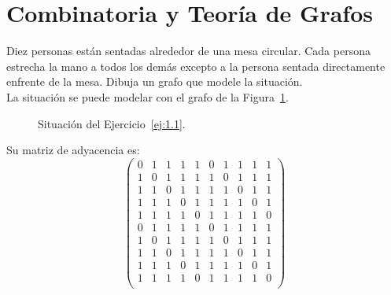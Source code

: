 \section{Combinatoria y Teoría de Grafos}

\begin{ejercicio}\label{ej:1.1}
    Diez personas están sentadas alrededor de una mesa circular. Cada persona estrecha la mano a todos los demás excepto a la persona sentada directamente enfrente de la mesa. Dibuja un grafo que modele la situación.\\

    La situación se puede modelar con el grafo de la Figura~\ref{fig:1.1}.
    \begin{figure}
        \centering
        \caption{Situación del Ejercicio~\ref{ej:1.1}.}
        \label{fig:1.1}
    \end{figure}

    Su matriz de adyacencia es:
    \begin{equation*}
        \begin{pmatrix}
            0 & 1 & 1 & 1 & 1 & 0 & 1 & 1 & 1 & 1 \\
            1 & 0 & 1 & 1 & 1 & 1 & 0 & 1 & 1 & 1 \\
            1 & 1 & 0 & 1 & 1 & 1 & 1 & 0 & 1 & 1 \\
            1 & 1 & 1 & 0 & 1 & 1 & 1 & 1 & 0 & 1 \\
            1 & 1 & 1 & 1 & 0 & 1 & 1 & 1 & 1 & 0 \\
            0 & 1 & 1 & 1 & 1 & 0 & 1 & 1 & 1 & 1 \\
            1 & 0 & 1 & 1 & 1 & 1 & 0 & 1 & 1 & 1 \\
            1 & 1 & 0 & 1 & 1 & 1 & 1 & 0 & 1 & 1 \\
            1 & 1 & 1 & 0 & 1 & 1 & 1 & 1 & 0 & 1 \\
            1 & 1 & 1 & 1 & 0 & 1 & 1 & 1 & 1 & 0 \\
        \end{pmatrix}
    \end{equation*}
\end{ejercicio}

